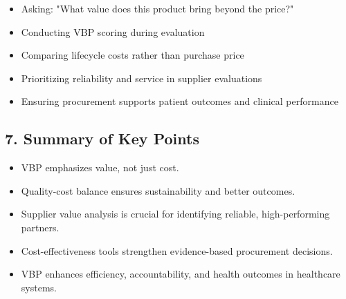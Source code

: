 \documentclass[10pt]{article}
\begin{document}
\begin{itemize}
  \item Asking: "What value does this product bring beyond the price?"
  \item Conducting VBP scoring during evaluation
  \item Comparing lifecycle costs rather than purchase price
  \item Prioritizing reliability and service in supplier evaluations
  \item Ensuring procurement supports patient outcomes and clinical performance
\end{itemize}

\subsection*{7. Summary of Key Points}
\begin{itemize}
  \item VBP emphasizes value, not just cost.
  \item Quality-cost balance ensures sustainability and better outcomes.
  \item Supplier value analysis is crucial for identifying reliable, high-performing partners.
  \item Cost-effectiveness tools strengthen evidence-based procurement decisions.
  \item VBP enhances efficiency, accountability, and health outcomes in healthcare systems.
\end{itemize}
\end{document}
